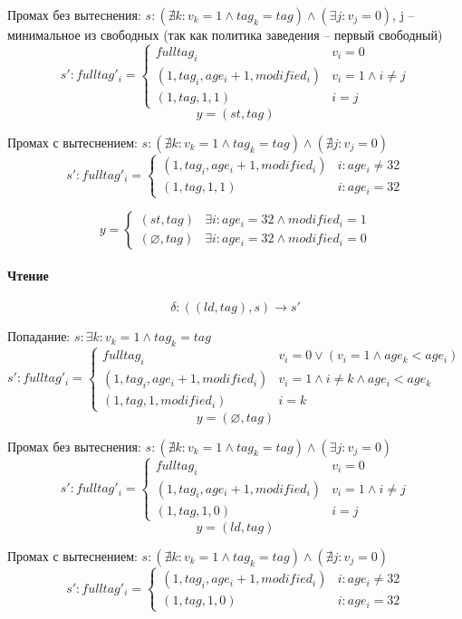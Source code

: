 Промах без вытеснения: $s: (\nexists k : v_k = 1 \land tag_k = tag) \land (\exists j: v_j = 0)$, j -- минимальное из свободных (так как политика заведения -- первый свободный)
\[
s':fulltag'_i =
\begin{cases}
	fulltag_i & v_i = 0 \\
	(1,tag_i,age_{i}+1,modified_i) & v_i = 1 \land i \neq j \\
	(1,tag,1,1) & i = j
\end{cases}
\]
$$y = (st,tag)$$

Промах с вытеснением: $s: (\nexists k : v_k = 1 \land tag_k = tag) \land (\nexists j: v_j = 0)$
\[
s':fulltag'_i =
\begin{cases}
	(1,tag_i,age_{i}+1,modified_i) & i : age_i \neq 32 \\
	(1,tag,1,1) & i : age_i = 32
\end{cases}
\]

\[
y =
\begin{cases}
	(st,tag) & \exists i : age_i = 32 \land modified_i = 1 \\
	(\varnothing,tag) & \exists i : age_i = 32 \land modified_i = 0
\end{cases}
\]

\paragraph*{Чтение}

$$\delta : ((ld,tag),s) \rightarrow s'$$

Попадание: $s: \exists k : v_k = 1 \land tag_k = tag$
\[
s':fulltag'_i =
\begin{cases}
	fulltag_i & v_i = 0 \lor (v_i = 1 \land age_k < age_i)\\
	(1,tag_i,age_{i}+1,modified_i) & v_i = 1 \land i \neq k \land age_i < age_k \\
	(1,tag,1,modified_i) & i = k
\end{cases}
\]
$$y = (\varnothing,tag)$$

Промах без вытеснения: $s: (\nexists k : v_k = 1 \land tag_k = tag) \land (\exists j: v_j = 0)$
\[
s':fulltag'_i =
\begin{cases}
	fulltag_i & v_i = 0 \\
	(1,tag_i,age_{i}+1,modified_i) & v_i = 1 \land i \neq j \\
	(1,tag,1,0) & i = j
\end{cases}
\]
$$y = (ld,tag)$$

Промах с вытеснением: $s: (\nexists k : v_k = 1 \land tag_k = tag) \land (\nexists j: v_j = 0)$
\[
s':fulltag'_i =
\begin{cases}
	(1,tag_i,age_{i}+1,modified_i) & i : age_i \neq 32 \\
	(1,tag,1,0) & i : age_i = 32
\end{cases}
\]

